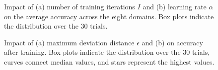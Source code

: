 \begin{figure}[b]
	\centering 
	\setlength{\abovecaptionskip}{6pt} 
	\setlength{\belowdisplayskip}{-5pt}
		\hspace{-8pt}
	\vspace{-.7ex}
	\caption{Impact of (a) number of training iterations $I$ and (b) learning rate $\alpha$ on the average accuracy across the eight domains. Box plots indicate the distribution over the 30 trials.}
	\vspace{-.8ex}
\end{figure} 

\begin{figure}[t]
    \vspace{-.5em}
	\centering 
	\setlength{\abovecaptionskip}{6pt} 
	\setlength{\belowdisplayskip}{-5pt}
	\hspace{-14pt}
	\vspace{-.7ex}
	\caption{Impact of (a) maximum deviation distance $\epsilon$ and (b) on accuracy after training. Box plots indicate the distribution over the 30 trials, curves connect median values, and stars represent the highest values.}
	\vspace{-.8ex}
\end{figure} 

